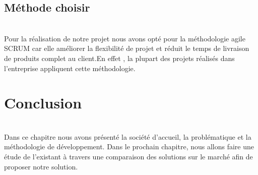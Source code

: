 \subsection{\Large Méthode choisir }
\texttt{}\\[0.1cm]

\textsf{\selectfont{}
Pour la réalisation de notre projet nous avons opté pour la méthodologie agile SCRUM car elle
améliorer la flexibilité de projet et réduit le temps de livraison de produits complet au client.En
effet , la plupart des projets réalisés dans l’entreprise appliquent cette méthodologie.}\\[0.2cm]

\section{\LARGE    Conclusion}
\texttt{}\\[0.3cm]
\textsf{\selectfont{} Dans ce chapitre nous avons présenté la société d’accueil, la problématique et la méthodologie de développement.
    Dans le prochain chapitre, nous allons faire une étude de l’existant à travers une comparaison des solutions sur le marché afin de proposer notre solution. 
}






